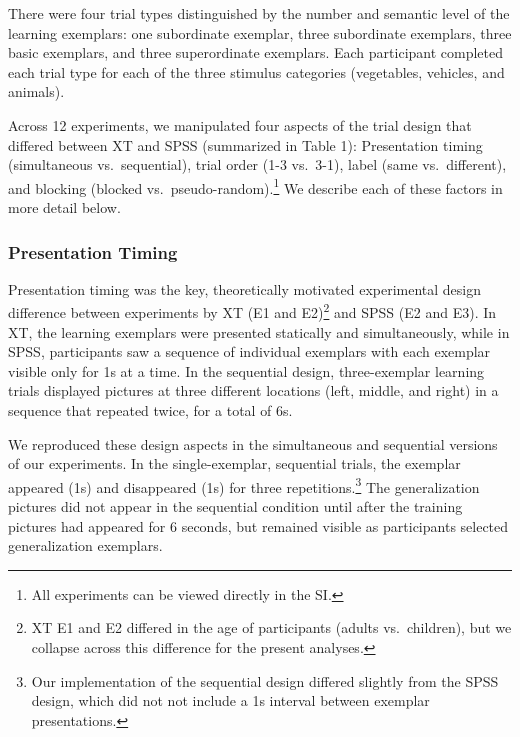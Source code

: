 \documentclass[english,floatsintext,man]{apa6}
\theoremstyle{definition}
\theoremstyle{definition}
\theoremstyle{remark}
\begin{document}
There were four trial types distinguished by the number and semantic
level of the learning exemplars: one subordinate exemplar, three
subordinate exemplars, three basic exemplars, and three superordinate
exemplars. Each participant completed each trial type for each of the
three stimulus categories (vegetables, vehicles, and animals).

Across 12 experiments, we manipulated four aspects of the trial design
that differed between XT and SPSS (summarized in Table 1): Presentation
timing (simultaneous vs.~sequential), trial order (1-3 vs.~3-1), label
(same vs.~different), and blocking (blocked
vs.~pseudo-random).\footnote{All experiments can be viewed directly in the SI.}
We describe each of these factors in more detail below.

\subsubsection{Presentation Timing}\label{presentation-timing}

Presentation timing was the key, theoretically motivated experimental
design difference between experiments by XT (E1 and
E2)\footnote{XT E1 and E2 differed in the age of participants (adults vs.\ children), but we collapse across this difference for the present analyses.}
and SPSS (E2 and E3). In XT, the learning exemplars were presented
statically and simultaneously, while in SPSS, participants saw a
sequence of individual exemplars with each exemplar visible only for 1s
at a time. In the sequential design, three-exemplar learning trials
displayed pictures at three different locations (left, middle, and
right) in a sequence that repeated twice, for a total of 6s.

We reproduced these design aspects in the simultaneous and sequential
versions of our experiments. In the single-exemplar, sequential trials,
the exemplar appeared (1s) and disappeared (1s) for three
repetitions.\footnote{Our implementation of the sequential design differed slightly from the SPSS design, which did not not include a 1s interval between exemplar presentations.}
The generalization pictures did not appear in the sequential condition
until after the training pictures had appeared for 6 seconds, but
remained visible as participants selected generalization exemplars.
\end{document}
